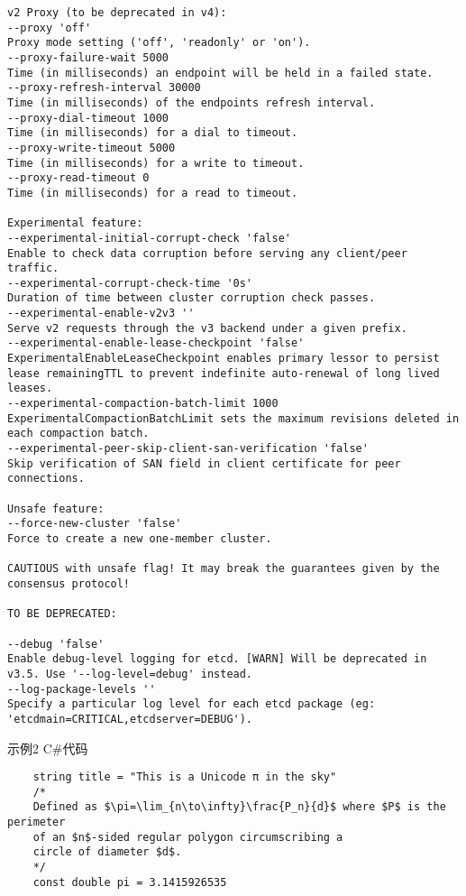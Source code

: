 \begin{verbatim}
v2 Proxy (to be deprecated in v4):
--proxy 'off'
Proxy mode setting ('off', 'readonly' or 'on').
--proxy-failure-wait 5000
Time (in milliseconds) an endpoint will be held in a failed state.
--proxy-refresh-interval 30000
Time (in milliseconds) of the endpoints refresh interval.
--proxy-dial-timeout 1000
Time (in milliseconds) for a dial to timeout.
--proxy-write-timeout 5000
Time (in milliseconds) for a write to timeout.
--proxy-read-timeout 0
Time (in milliseconds) for a read to timeout.

Experimental feature:
--experimental-initial-corrupt-check 'false'
Enable to check data corruption before serving any client/peer traffic.
--experimental-corrupt-check-time '0s'
Duration of time between cluster corruption check passes.
--experimental-enable-v2v3 ''
Serve v2 requests through the v3 backend under a given prefix.
--experimental-enable-lease-checkpoint 'false'
ExperimentalEnableLeaseCheckpoint enables primary lessor to persist lease remainingTTL to prevent indefinite auto-renewal of long lived leases.
--experimental-compaction-batch-limit 1000
ExperimentalCompactionBatchLimit sets the maximum revisions deleted in each compaction batch.
--experimental-peer-skip-client-san-verification 'false'
Skip verification of SAN field in client certificate for peer connections.

Unsafe feature:
--force-new-cluster 'false'
Force to create a new one-member cluster.

CAUTIOUS with unsafe flag! It may break the guarantees given by the consensus protocol!

TO BE DEPRECATED:

--debug 'false'
Enable debug-level logging for etcd. [WARN] Will be deprecated in v3.5. Use '--log-level=debug' instead.
--log-package-levels ''
Specify a particular log level for each etcd package (eg: 'etcdmain=CRITICAL,etcdserver=DEBUG').

\end{verbatim}

{\noindent 示例2 C\#代码}
\begin{verbatim}
    string title = "This is a Unicode π in the sky"
    /*
    Defined as $\pi=\lim_{n\to\infty}\frac{P_n}{d}$ where $P$ is the perimeter
    of an $n$-sided regular polygon circumscribing a
    circle of diameter $d$.
    */
    const double pi = 3.1415926535
\end{verbatim}


